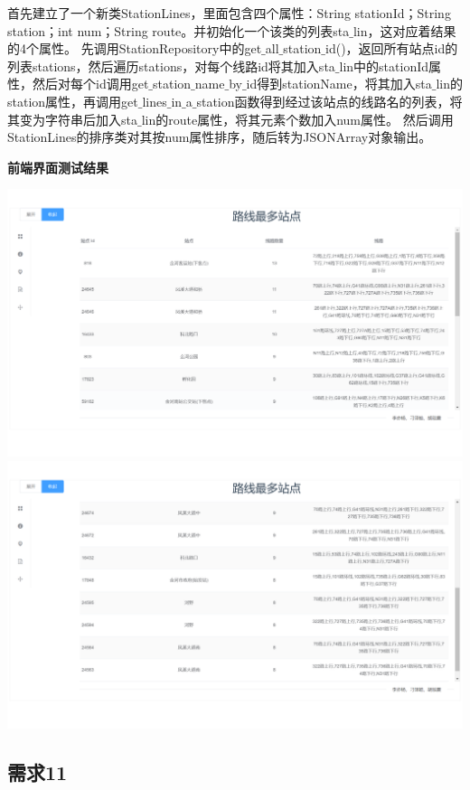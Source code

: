\documentclass[11pt,a4paper]{article}
\begin{document}
首先建立了一个新类StationLines，里面包含四个属性：String stationId；String station；int num；String route。并初始化一个该类的列表sta$\_$lin，这对应着结果的4个属性。
先调用StationRepository中的get$\_$all$\_$station$\_$id()，返回所有站点id的列表stations，然后遍历stations，对每个线路id将其加入sta$\_$lin中的stationId属性，然后对每个id调用get$\_$station$\_$name$\_$by$\_$id得到stationName，将其加入sta$\_$lin的station属性，再调用get$\_$lines$\_$in$\_$a$\_$station函数得到经过该站点的线路名的列表，将其变为字符串后加入sta$\_$lin的route属性，将其元素个数加入num属性。
然后调用StationLines的排序类对其按num属性排序，随后转为JSONArray对象输出。

\textbf{前端界面测试结果} \\
\begin{center}
\centering
\includegraphics[scale=0.3]{./assets/demand10_1.png} \\ 
\includegraphics[scale=0.3]{./assets/demand10_2.png} 
\end{center}


\subsection{需求11}
\end{document}
